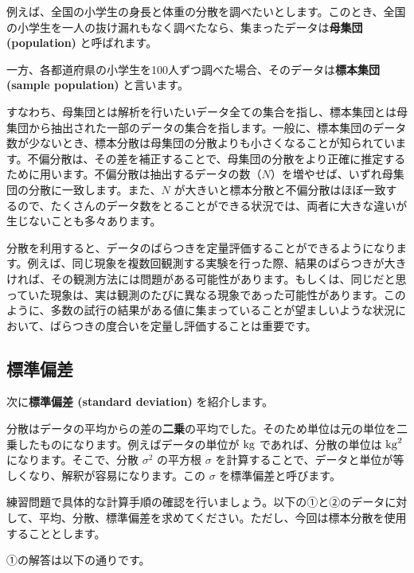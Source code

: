 

例えば、全国の小学生の身長と体重の分散を調べたいとします。このとき、全国の小学生を一人の抜け漏れもなく調べたなら、集まったデータは\textbf{母集団 (population)} と呼ばれます。

一方、各都道府県の小学生を100人ずつ調べた場合、そのデータは\textbf{標本集団 (sample population)} と言います。

すなわち、母集団とは解析を行いたいデータ全ての集合を指し、標本集団とは母集団から抽出された一部のデータの集合を指します。一般に、標本集団のデータ数が少ないとき、標本分散は母集団の分散よりも小さくなることが知られています。不偏分散は、その差を補正することで、母集団の分散をより正確に推定するために用います。不偏分散は抽出するデータの数（$N$）を増やせば、いずれ母集団の分散に一致します。また、$N$ が大きいと標本分散と不偏分散はほぼ一致するので、たくさんのデータ数をとることができる状況では、両者に大きな違いが生じないことも多々あります。


分散を利用すると、データのばらつきを定量評価することができるようになります。例えば、同じ現象を複数回観測する実験を行った際、結果のばらつきが大きければ、その観測方法には問題がある可能性があります。もしくは、同じだと思っていた現象は、実は観測のたびに異なる現象であった可能性があります。このように、多数の試行の結果がある値に集まっていることが望ましいような状況において、ばらつきの度合いを定量し評価することは重要です。


\subsection{標準偏差}


次に\textbf{標準偏差 (standard deviation)} を紹介します。

分散はデータの平均からの差の\textbf{二乗}の平均でした。そのため単位は元の単位を二乗したものになります。例えばデータの単位が ${\rm kg}$ であれば、分散の単位は ${\rm kg}^2$ になります。そこで、分散 $\sigma^2$ の平方根 $\sigma$ を計算することで、データと単位が等しくなり、解釈が容易になります。この $\sigma$ を標準偏差と呼びます。


練習問題で具体的な計算手順の確認を行いましょう。以下の①と②のデータに対して、平均、分散、標準偏差を求めてください。ただし、今回は標本分散を使用することとします。




①の解答は以下の通りです。


